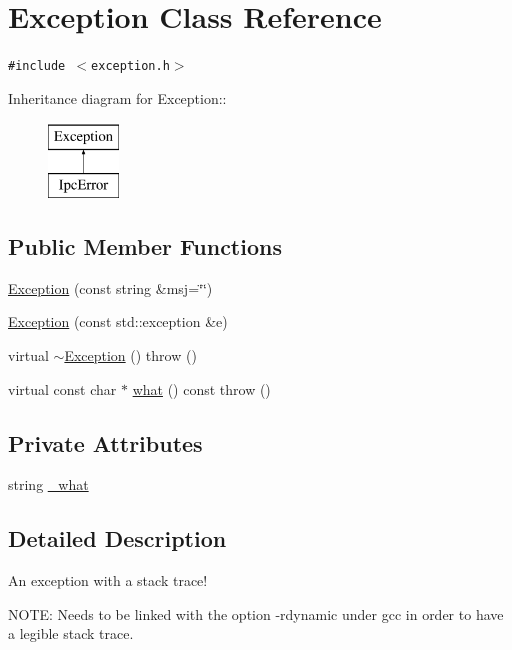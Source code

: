 \hypertarget{classException}{
\section{Exception Class Reference}
\label{classException}
}
{\tt \#include $<$exception.h$>$}

Inheritance diagram for Exception::\begin{figure}[H]
\begin{center}
\leavevmode
\includegraphics[height=2cm]{classException}
\end{center}
\end{figure}
\subsection*{Public Member Functions}
\begin{CompactItemize}
\item 
\hyperlink{classException_dfdfbffc77f1a57f6b338817ddac3b5e}{Exception} (const string \&msj=\char`\"{}\char`\"{})
\item 
\hyperlink{classException_843d2598ec9818ebeeebee3cafecaf0e}{Exception} (const std::exception \&e)
\item 
virtual \hyperlink{classException_d1ba411de295ef2eeb02ba26284a829a}{$\sim$Exception} ()  throw ()
\item 
virtual const char $\ast$ \hyperlink{classException_380f0477d9ef319911e7a8167bd47f1f}{what} () const   throw ()
\end{CompactItemize}
\subsection*{Private Attributes}
\begin{CompactItemize}
\item 
string \hyperlink{classException_48f934fa7a25381d1a9f8f7da7a98525}{\_\-what}
\end{CompactItemize}


\subsection{Detailed Description}
An exception with a stack trace!

NOTE: Needs to be linked with the option -rdynamic under gcc in order to have a legible stack trace. 

